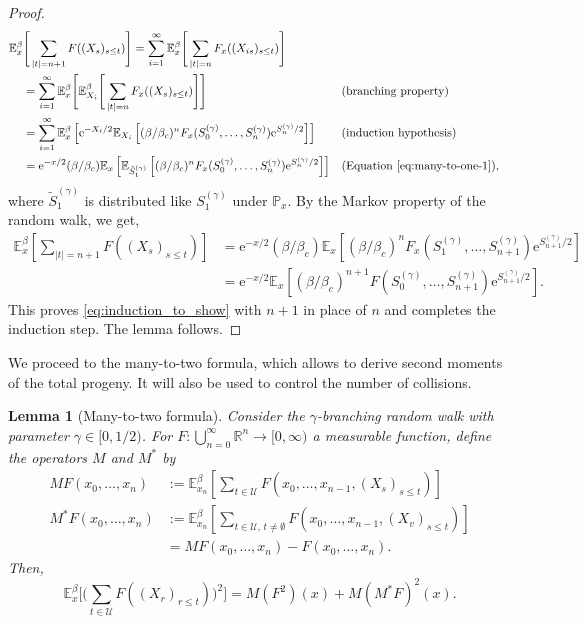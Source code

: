 \documentclass[a4paper, a4wide, 10pt, reqno]{amsart}
\theoremstyle{plain}
\newtheorem{lemma}[theorem]{Lemma}
\theoremstyle{definition}
\numberwithin{equation}{section}
\newcommand{\R}{{\mathbb R}}
\newcommand{\E}{\mathbb E}
\newcommand{\Prob}{\mathbb{P}}
\newcommand{\sU}{{\mathscr U}}
\newcommand{\re}{{\mathrm e}}
\begin{document}
\begin{proof}
	\begin{align*}
		 \E_x^\beta&\Bigg[\sum_{|t|=n+1} F((X_s)_{s\le t})\Bigg]        
		 = \sum_{i=1}^\infty \E_x^\beta\Bigg[ \sum_{|t|=n} F_x((X_{is})_{s\le t})\Bigg]                                                                                                                    \\
		 & = \sum_{i=1}^\infty \E_x^\beta\Bigg[ \E_{X_i}^\beta\Bigg[\sum_{|t|=n} F_x((X_s)_{s\le t})\Bigg]\Bigg]                                                 &  & \text{(branching property)}                 \\
		 & = \sum_{i=1}^\infty \E_x^\beta\left[ \re^{-X_i/2} \E_{X_i}\left[(\beta/\beta_c)^nF_x(S_0^{(\gamma)},\ldots,S_n^{(\gamma)})\re^{S_n^{(\gamma)}/2}\right]\right] &  & \text{(induction hypothesis)}               \\
		 & = \re^{-x/2} (\beta/\beta_c) \E_x\left[ \E_{\tilde S^{(\gamma)}_1}\left[(\beta/\beta_c)^nF_x(S_0^{(\gamma)},\ldots,S_n^{(\gamma)})\re^{S_n^{(\gamma)}/2}\right]\right]               &  & \text{(Equation \eqref{eq:many-to-one-1})},
	\end{align*}
	where $\tilde S^{(\gamma)}_1$ is distributed like $S_1^{(\gamma)}$ under $\Prob_x$. By the Markov property of the random walk, we get,
	\begin{align*}
		\E_x^\beta\left[\sum_{|t|=n+1} F((X_s)_{s\le t})\right]
		 & = \re^{-x/2} (\beta/\beta_c) \E_x\left[ (\beta/\beta_c)^nF_x(S_1^{(\gamma)},\ldots,S_{n+1}^{(\gamma)})\re^{S_{n+1}^{(\gamma)}/2}\right] \\
		 & = \re^{-x/2} \E_x\left[ (\beta/\beta_c)^{n+1}F(S_0^{(\gamma)},\ldots,S_{n+1}^{(\gamma)})\re^{S_{n+1}^{(\gamma)}/2}\right].
	\end{align*}
	This proves \eqref{eq:induction_to_show} with $n+1$ in place of $n$ and completes the induction step. The lemma follows.
\end{proof}


We proceed to the many-to-two formula, which allows to derive second moments of the total progeny. It will also be used to control the number of collisions.

\begin{lemma}[Many-to-two formula]
	\label{lem:many-to-two}
    Consider the $\gamma$-branching random walk with parameter $\gamma\in[0,1/2)$.
	For $F\colon\bigcup_{n=0}^\infty {\R}^n\to [0,\infty)$ a measurable function, define the operators $M$ and $M^*$  by
	\begin{align*}
		MF(x_0,\ldots,x_n) &:= \E_{x_n}^\beta\left[\sum_{t\in \sU} F(x_0,\ldots,x_{n-1},(X_s)_{s\le t})\right]\\
        M^*F(x_0,\ldots,x_n) &:= \E_{x_n}^\beta\left[\sum_{t\in \sU,\,t\ne \emptyset} F(x_0,\ldots,x_{n-1},(X_v)_{s\le t})\right]\\
        &= MF(x_0,\ldots,x_n) - F(x_0,\ldots,x_n).
	\end{align*}
	Then,
	\[
		\E_x^\beta\bigg[\bigg(\sum_{t\in \sU}F((X_r)_{r\le t})\bigg)^2\bigg] = M(F^2)(x) + M(M^*F)^2(x).
	\]
\end{lemma}
\end{document}

